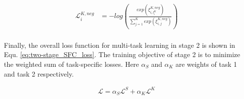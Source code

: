 \begin{equation}
  \begin{aligned}
    \mathcal{L}^{K,neg}_{i} &= -log(\frac{exp(\xi_{i,l^{K}_{i}}^{K,neg})}{\sum_{j=1}^{K}exp(\xi_{i,j}^{K,neg})}) \\
    \label{eq: neg top-k loss}
  \end{aligned}
\end{equation}

Finally,  the  overall  loss  function for multi-task learning in stage 2 is
shown in Equ. \ref{eq:two-stage_SFC_loss}. The training objective of stage 2 is
to  minimize  the  weighted  sum  of task-specific losses. Here $\alpha_S$ and
$\alpha_K$  are  weights  of  task  1  and  task  2  respectively.

\begin{align}
  \mathcal{L} = \alpha_S \mathcal{L}^S + \alpha_K \mathcal{L}^K
  \label{eq:two-stage_SFC_loss}
\end{align}


